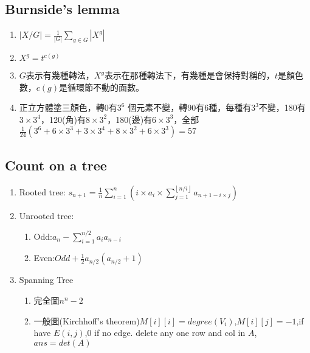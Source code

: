 \subsection{Burnside's lemma}
\begin{enumerate}\itemsep = -3pt
	\item $|X/G| = \frac{1}{|G|}\sum_{g \in G}|X^g|$
	\item $X^g=t^{c(g)}$
	\item $G$表示有幾種轉法，$X^g$表示在那種轉法下，有幾種是會保持對稱的，$t$是顏色數，$c(g)$是循環節不動的面數。
	\item 正立方體塗三顏色，轉0有$3^6$ 個元素不變，轉90有6種，每種有$3^3$不變，180有$3\times 3^4$，120(角)有$8\times 3^2$，180(邊)有$6\times 3^3$，全部$\frac{1}{24}\left(3^6+6\times 3^3 + 3 \times 3^4 + 8 \times 3^2 + 6 \times 3^3 \right) = 57$
\end{enumerate}

\subsection{Count on a tree}
\begin{enumerate}\itemsep = -3pt
	\item Rooted tree: $s_{n+1}=\frac{1}{n}\sum_{i=1}^{n}(i\times a_i\times \sum_{j=1}^{\left \lfloor  n/i\right \rfloor} a_{n+1-i\times j})$
	\item Unrooted tree: 
	\begin{enumerate}\itemsep = -2pt
		\item Odd:$a_n-\sum_{i=1}^{n/2}a_ia_{n-i}$
		\item Even:$Odd+\frac{1}{2}a_{n/2}(a_{n/2}+1)$
	\end{enumerate}
	\item Spanning Tree
	\begin{enumerate}\itemsep = -2pt
		\item 完全圖$n^n-2$
		\item 一般圖(Kirchhoff's theorem)$M[i][i]=degree(V_i)$,$M[i][j]=-1$,if have $E(i,j)$,$0$ if no edge. delete any one row and col in $A$, $ans = det(A)$
	\end{enumerate}
\end{enumerate}

%
